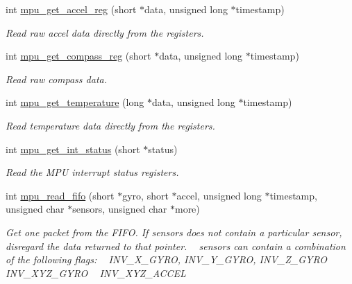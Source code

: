 \begin{DoxyCompactItemize}
int \hyperlink{group___d_r_i_v_e_r_s_gae4ae960e5df78049ece2647772a3d809}{mpu\+\_\+get\+\_\+accel\+\_\+reg} (short $\ast$data, unsigned long $\ast$timestamp)
\begin{DoxyCompactList}\small\item\em Read raw accel data directly from the registers. \end{DoxyCompactList}\item 
int \hyperlink{group___d_r_i_v_e_r_s_ga65e6b0ce980b8c0255d7be9b55c88c08}{mpu\+\_\+get\+\_\+compass\+\_\+reg} (short $\ast$data, unsigned long $\ast$timestamp)
\begin{DoxyCompactList}\small\item\em Read raw compass data. \end{DoxyCompactList}\item 
int \hyperlink{group___d_r_i_v_e_r_s_gaa449b565a157b4b8ca0f491b7ed46018}{mpu\+\_\+get\+\_\+temperature} (long $\ast$data, unsigned long $\ast$timestamp)
\begin{DoxyCompactList}\small\item\em Read temperature data directly from the registers. \end{DoxyCompactList}\item 
int \hyperlink{group___d_r_i_v_e_r_s_ga0afd02d8c76d3278b488ef7038c26e3e}{mpu\+\_\+get\+\_\+int\+\_\+status} (short $\ast$status)
\begin{DoxyCompactList}\small\item\em Read the M\+PU interrupt status registers. \end{DoxyCompactList}\item 
int \hyperlink{group___d_r_i_v_e_r_s_ga2da20453aafbbba4a0f6fb9fbdd25572}{mpu\+\_\+read\+\_\+fifo} (short $\ast$gyro, short $\ast$accel, unsigned long $\ast$timestamp, unsigned char $\ast$sensors, unsigned char $\ast$more)
\begin{DoxyCompactList}\small\item\em Get one packet from the F\+I\+FO. If {\itshape sensors} does not contain a particular sensor, disregard the data returned to that pointer. ~\newline
 {\itshape sensors} can contain a combination of the following flags\+: ~\newline
 I\+N\+V\+\_\+\+X\+\_\+\+G\+Y\+RO, I\+N\+V\+\_\+\+Y\+\_\+\+G\+Y\+RO, I\+N\+V\+\_\+\+Z\+\_\+\+G\+Y\+RO ~\newline
 I\+N\+V\+\_\+\+X\+Y\+Z\+\_\+\+G\+Y\+RO ~\newline
 I\+N\+V\+\_\+\+X\+Y\+Z\+\_\+\+A\+C\+C\+EL ~\newline

\end{DoxyCompactList}
\end{DoxyCompactItemize}

